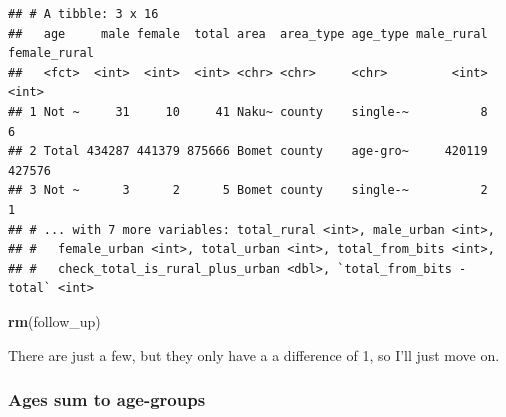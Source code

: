 \documentclass[
]{book}
\newenvironment{Shaded}{\begin{snugshade}}{\end{snugshade}}
\newcommand{\CommentTok}[1]{\textcolor[rgb]{0.56,0.35,0.01}{\textit{#1}}}
\newcommand{\DataTypeTok}[1]{\textcolor[rgb]{0.13,0.29,0.53}{#1}}
\newcommand{\DecValTok}[1]{\textcolor[rgb]{0.00,0.00,0.81}{#1}}
\newcommand{\KeywordTok}[1]{\textcolor[rgb]{0.13,0.29,0.53}{\textbf{#1}}}
\newcommand{\NormalTok}[1]{#1}
\newcommand{\OperatorTok}[1]{\textcolor[rgb]{0.81,0.36,0.00}{\textbf{#1}}}
\newcommand{\StringTok}[1]{\textcolor[rgb]{0.31,0.60,0.02}{#1}}
\begin{document}
\begin{Shaded}
\end{Shaded}

\begin{verbatim}
## # A tibble: 3 x 16
##   age     male female  total area  area_type age_type male_rural female_rural
##   <fct>  <int>  <int>  <int> <chr> <chr>     <chr>         <int>        <int>
## 1 Not ~     31     10     41 Naku~ county    single-~          8            6
## 2 Total 434287 441379 875666 Bomet county    age-gro~     420119       427576
## 3 Not ~      3      2      5 Bomet county    single-~          2            1
## # ... with 7 more variables: total_rural <int>, male_urban <int>,
## #   female_urban <int>, total_urban <int>, total_from_bits <int>,
## #   check_total_is_rural_plus_urban <dbl>, `total_from_bits - total` <int>
\end{verbatim}

\begin{Shaded}
\begin{Highlighting}[]
\KeywordTok{rm}\NormalTok{(follow_up)}
\end{Highlighting}
\end{Shaded}

There are just a few, but they only have a a difference of 1, so I'll just move on.

\hypertarget{ages-sum-to-age-groups}{%
\subsubsection{Ages sum to age-groups}\label{ages-sum-to-age-groups}}
\end{document}
